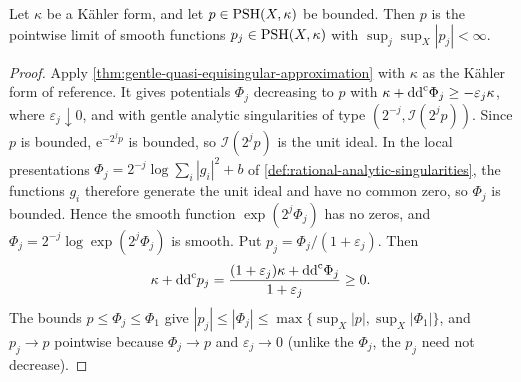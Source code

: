 \begin{lemma}\label{lem:bounded-smooth-kahler-approximation}
Let $\kappa$ be a K\"ahler form, and let $p\in\mathrm{PSH}(X,\kappa)$ be bounded. Then $p$ is the pointwise limit of smooth functions $p_j\in\mathrm{PSH}(X,\kappa)$ with $\sup_j\sup_X|p_j|<\infty$.
\end{lemma}
\begin{proof}
Apply \cref{thm:gentle-quasi-equisingular-approximation} with $\kappa$ as the K\"ahler form of reference. It gives potentials $\Phi_j$ decreasing to $p$ with $\kappa+\mathrm{dd}^{\mathrm{c}}\Phi_j\geq-\varepsilon_j\kappa$, where $\varepsilon_j\downarrow0$, and with gentle analytic singularities of type $(2^{-j},\mathcal I(2^jp))$. Since $p$ is bounded, $\mathrm e^{-2^jp}$ is bounded, so $\mathcal I(2^jp)$ is the unit ideal. In the local presentations $\Phi_j=2^{-j}\log\sum_i|g_i|^2+b$ of \cref{def:rational-analytic-singularities}, the functions $g_i$ therefore generate the unit ideal and have no common zero, so $\Phi_j$ is bounded. Hence the smooth function $\exp(2^j\Phi_j)$ has no zeros, and $\Phi_j=2^{-j}\log\exp(2^j\Phi_j)$ is smooth. Put $p_j=\Phi_j/(1+\varepsilon_j)$. Then
\[
 \kappa+\mathrm{dd}^{\mathrm{c}} p_j=\frac{(1+\varepsilon_j)\kappa+\mathrm{dd}^{\mathrm{c}}\Phi_j}{1+\varepsilon_j}\geq0.
\]
The bounds $p\leq\Phi_j\leq\Phi_1$ give $|p_j|\leq|\Phi_j|\leq\max\{\sup_X|p|,\sup_X|\Phi_1|\}$, and $p_j\to p$ pointwise because $\Phi_j\to p$ and $\varepsilon_j\to0$ (unlike the $\Phi_j$, the $p_j$ need not decrease).
\end{proof}

